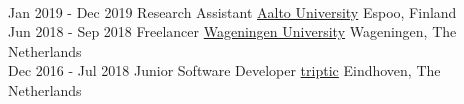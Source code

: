\documentclass[a4paper]{twentysecondcv} %
\begin{document}
\begin{twentyshort}
{\begin{itemize}
        \end{itemize}
        }
        \\
    \twentyitem
    	{Jan 2019 -}
		{Dec 2019}
        {Research Assistant}
		{\href{https://www.aalto.fi/en}{Aalto University}}
        {Espoo, Finland}
        {
        }
        \\
    \twentyitem
    	{Jun 2018 -}
		{Sep 2018}
        {Freelancer}
		{\href{https://wur.nl/en}{Wageningen University}}
        {Wageningen, The Netherlands}
        {
        }
        \\
    \twentyitem
    	{Dec 2016 -}
		{Jul 2018}
        {Junior Software Developer}
		{\href{https://www.triptic.nl/}{triptic}}
        {Eindhoven, The Netherlands}
        {
        }
\end{twentyshort}

\end{document}
